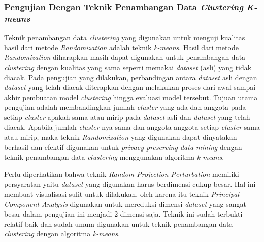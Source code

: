 \subsubsection{Pengujian Dengan Teknik Penambangan Data \textit{Clustering} \textit{K-means}}
\label{subsubsec:analisis-kmeans}

Teknik penambangan data \textit{clustering} yang digunakan untuk menguji kualitas hasil dari metode \textit{Randomization} adalah teknik \textit{k-means}. Hasil dari metode \textit{Randomization} diharapkan masih dapat digunakan untuk penambangan data \textit{clustering} dengan kualitas yang sama seperti memakai \textit{dataset} (asli) yang tidak diacak. Pada pengujian yang dilakukan, perbandingan antara \textit{dataset} asli dengan \textit{dataset} yang telah diacak diterapkan dengan melakukan proses dari awal sampai akhir pembuatan model \textit{clustering} hingga evaluasi model tersebut. Tujuan utama pengujian adalah membandingkan jumlah \textit{cluster} yang ada dan anggota pada setiap \textit{cluster} apakah sama atau mirip pada \textit{dataset} asli dan \textit{dataset} yang telah diacak. Apabila jumlah \textit{cluster}-nya sama dan anggota-anggota setiap \textit{cluster} sama atau mirip, maka teknik \textit{Randomization} yang digunakan dapat dinyatakan berhasil dan efektif digunakan untuk \textit{privacy preserving data mining} dengan teknik penambangan data \textit{clustering} menggunakan algoritma \textit{k-means}.

Perlu diperhatikan bahwa teknik \textit{Random Projection Perturbation} memiliki persyaratan yaitu \textit{dataset} yang digunakan harus berdimensi cukup besar. Hal ini membuat visualisasi sulit untuk dilakukan, oleh karena itu teknik \textit{Principal Component Analysis} digunakan untuk mereduksi dimensi \textit{dataset} yang sangat besar dalam pengujian ini menjadi 2 dimensi saja. Teknik ini sudah terbukti relatif baik dan sudah umum digunakan untuk teknik penambangan data \textit{clustering} dengan algoritma \textit{k-means}.

